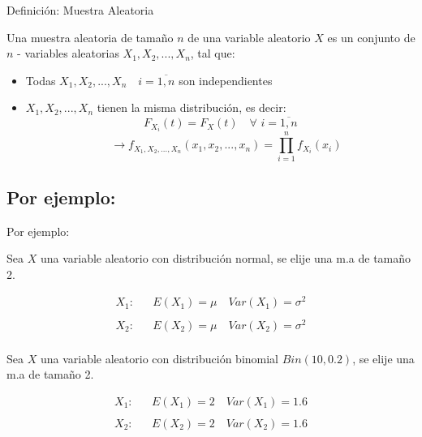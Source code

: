 \documentclass[
  ignorenonframetext,
]{beamer}
\begin{document}
\begin{frame}{Definición: Muestra Aleatoria}

Una muestra aleatoria de tamaño \(n\) de una variable aleatorio \(X\) es
un conjunto de \(n\) - variables aleatorias \(X_1,X_2,...,X_n\), tal
que:

\begin{itemize}
  \item Todas $X_1,X_2,...,X_n \quad i=\overline{1,n}$ son independientes
  \item $X_1,X_2,...,X_n$ tienen la misma distribución, es decir:
        $$F_{X_i}(t)=F_{X}(t)\quad \forall \,\,i=\overline{1,n}$$
        $$\quad \longrightarrow f_{X_1,X_2,...,X_n}(x_1,x_2,...,x_n)=\prod_{i=1}^{n} f_{X_i}(x_i) $$
\end{itemize}

\end{frame}

\hypertarget{por-ejemplo}{%
\subsection{Por ejemplo:}\label{por-ejemplo}}

\begin{frame}{Por ejemplo:}

Sea \(X\) una variable aleatorio con distribución normal, se elije una
m.a de tamaño 2.

\[\begin{array}{rcl}
X_1: &  &E(X_1)=\mu \quad Var(X_1)=\sigma^2\\ 
 &   & \\ 
X_2: & &E(X_2)=\mu \quad Var(X_2)=\sigma^2\\ 
\end{array}\]

\justifying Sea \(X\) una variable aleatorio con distribución binomial
\(Bin(10,0.2)\), se elije una m.a de tamaño 2.

\[\begin{array}{rcl}
X_1: &  &E(X_1)=2 \quad Var(X_1)=1.6\\ 
 &   & \\ 
X_2: & &E(X_2)=2 \quad Var(X_2)=1.6\\ 
\end{array}\]

\end{frame}

\hypertarget{section-5}{%
\subsection{}\label{section-5}}
\end{document}
